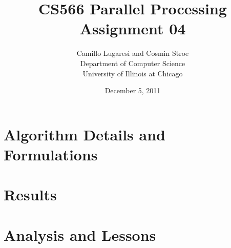 \documentclass{article}
\title{CS566 Parallel Processing \\ Assignment 04}
\author{Camillo Lugaresi and Cosmin Stroe \vspace{20pt} \\ Department of Computer Science \\
University of Illinois at Chicago}
\date{December 5, 2011}
\begin{document}
\maketitle
\newpage

\section{Algorithm Details and Formulations}






\section{Results}


\section{Analysis and Lessons}

\clearpage

\appendix
%
%
%
%
%
%
%
%
\end{document}
